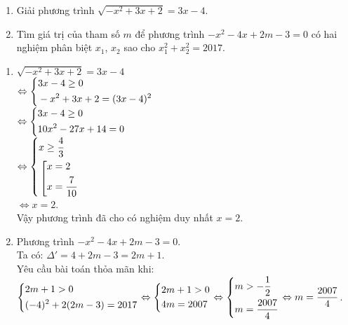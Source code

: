 \begin{bt}%
 \hfill
 \begin{enumerate}
  \item Giải phương trình $\sqrt{-x^2 + 3x + 2} = 3x - 4$.
  \item Tìm giá trị của tham số $m$ để phương trình $-x^2 - 4x + 2m - 3 = 0$ có hai nghiệm phân biệt $x_1$, $x_2$ sao cho $x_1^2 + x_2^2 = 2017$.
 \end{enumerate}
 \loigiai
 {
 \begin{enumerate}
  \item \hspace*{0.6cm} $\sqrt{-x^2 + 3x + 2} = 3x - 4$\\
  $\Leftrightarrow \left\{\begin{aligned}& 3x-4 \geq 0 \\& -x^2 + 3x + 2 = (3x-4)^2\end{aligned}\right.$\\
  $\Leftrightarrow \left\{\begin{aligned}& 3x-4 \geq 0 \\& 10x^2-27x+14 = 0\end{aligned}\right.$\\
  $\Leftrightarrow \left\{\begin{aligned}& x \geq \dfrac{4}{3} \\& \left[\begin{aligned}& x=2 \\& x = \dfrac{7}{10}\end{aligned}\right.\end{aligned}\right.$\\
  $\Leftrightarrow x = 2$.\\
  Vậy phương trình đã cho có nghiệm duy nhất $x=2$.
  \item Phương trình $-x^2 - 4x + 2m - 3 = 0$.\\
  Ta có: $\Delta' = 4+2m-3 = 2m + 1$.\\
  Yêu cầu bài toán thỏa mãn khi:\\
  $\left\{\begin{aligned}& 2m + 1 > 0 \\& (-4)^2 + 2(2m-3) = 2017\end{aligned}\right. \Leftrightarrow \left\{\begin{aligned}& 2m + 1 > 0 \\& 4m = 2007\end{aligned}\right. \Leftrightarrow \left\{\begin{aligned}& m > -\dfrac{1}{2} \\& m = \dfrac{2007}{4}\end{aligned}\right. \Leftrightarrow m = \dfrac{2007}{4}$.
 \end{enumerate}
 }
\end{bt}



